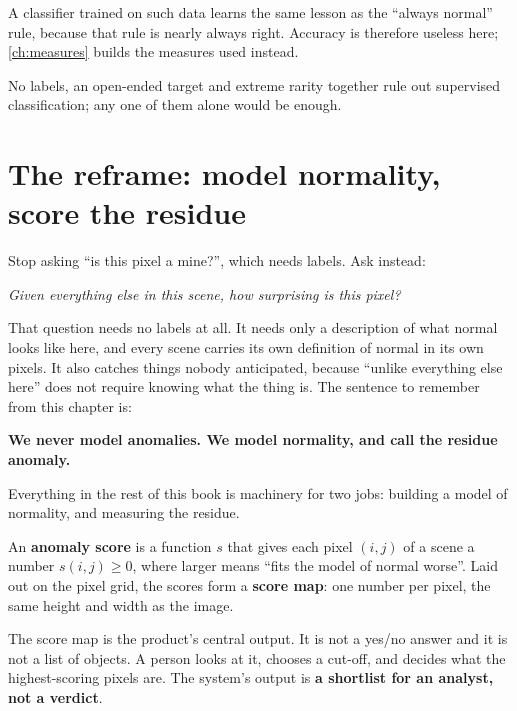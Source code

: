 A classifier trained on such data learns the same lesson as the ``always normal'' rule, because
that rule is nearly always right. Accuracy is therefore useless here; \cref{ch:measures} builds
the measures used instead.

\begin{keypoint}
No labels, an open-ended target and extreme rarity together rule out supervised
classification; any one of them alone would be enough.
\end{keypoint}

\section{The reframe: model normality, score the residue}\label{sec:problem:reframe}

Stop asking ``is this pixel a mine?'', which needs labels. Ask instead:
\begin{center}
\emph{Given everything else in this scene, how surprising is this pixel?}
\end{center}
That question needs no labels at all. It needs only a description of what normal looks like
here, and every scene carries its own definition of normal in its own pixels. It also catches
things nobody anticipated, because ``unlike everything else here'' does not require knowing what
the thing is. The sentence to remember from this chapter is:

\begin{center}
\textbf{We never model anomalies. We model normality, and call the residue anomaly.}
\end{center}

Everything in the rest of this book is machinery for two jobs: building a model of normality,
and measuring the residue.

\begin{definition}
An \textbf{anomaly score} is a function $s$ that gives each pixel $(i,j)$ of a scene a number
$s(i,j) \ge 0$, where larger means ``fits the model of normal worse''. Laid out on the pixel
grid, the scores form a \textbf{score map}: one number per pixel, the same height and width as
the image.
\end{definition}

The score map is the product's central output. It is not a yes/no answer and it is not a list of
objects. A person looks at it, chooses a cut-off, and decides what the highest-scoring pixels
are. The system's output is \textbf{a shortlist for an analyst, not a verdict}.


